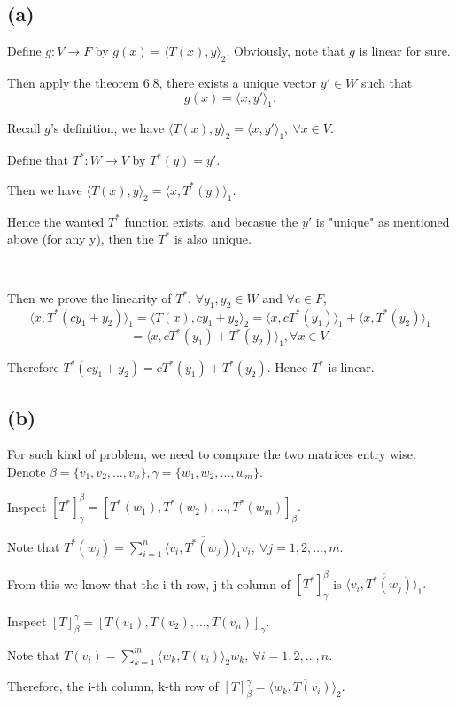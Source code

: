 \documentclass[12pt]{article}%
\begin{document}
\subsection{(a)}
Define $g:V \to F$ by $g(x)=\langle T(x),y \rangle_2.$ Obviously, note that
$g$ is linear for sure.

Then apply the theorem 6.8, there exists a unique vector $y' \in W$ such that 
$$g(x)=\langle x,y' \rangle_1.$$

Recall $g$'s definition, we have $\langle T(x),y \rangle_2=\langle x,y' \rangle_1, ~\forall x \in V.$

Define that $T^*:W \to V$ by $T^*(y)=y'.$

Then we have $\langle T(x),y \rangle_2=\langle x,T^*(y) \rangle_1.$

Hence the wanted $T^*$ function exists, and becasue the $y'$ is "unique" as mentioned above (for any y),
then the $T^*$ is also unique.

~\ 


Then we prove the linearity of $T^*.$ $\forall y_1,y_2 \in W$ and $\forall c \in F$,
$$\langle x,T^*(cy_1+y_2) \rangle_1 = \langle T(x),cy_1+y_2 \rangle_2
=\langle x, cT^*(y_1) \rangle_1 + \langle x, T^*(y_2) \rangle_1 $$
$$=\langle x, cT^*(y_1)+T^*(y_2) \rangle_1, \forall x \in V.$$

Therefore $T^*(cy_1+y_2) = cT^*(y_1)+T^*(y_2).$ Hence $T^*$ is linear.

\subsection{(b)}
For such kind of problem, we need to compare the two matrices entry wise.
Denote $\beta=\{v_1,v_2,\dots, v_n\}, \gamma=\{w_1,w_2,\dots,w_m\}.$

Inspect $[T^*]_\gamma^{\beta}=[T^*(w_1),T^*(w_2),\dots,T^*(w_m)]_\beta.$

Note that $T^*(w_j)=\sum_{i=1}^n \overline{\langle v_i,T^*(w_j) \rangle_1}v_i, ~\forall j=1,2,\dots,m.$

From this we know that the i-th row, j-th column of $[T^*]_\gamma^{\beta}$ is $\overline{\langle v_i,T^*(w_j) \rangle_1}.$

Inspect $[T]_\beta^{\gamma}=[T(v_1),T(v_2),\dots,T(v_n)]_\gamma$.

Note that $T(v_i)=\sum_{k=1}^m \overline{\langle w_k,T(v_i) \rangle_2}w_k, ~\forall i=1,2,\dots,n.$

Therefore, the i-th column, k-th row of $[T]_{\beta}^{\gamma}=\overline{\langle w_k,T(v_i) \rangle_2}.$
\end{document}
